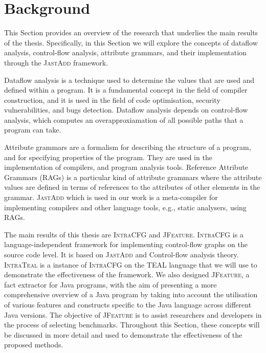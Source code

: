 \section{Background}
\label{sec:background}
This Section provides an overview of the research that 
underlies the main results of the thesis. Specifically, in this Section we will explore
the concepts of dataflow analysis, control-flow analysis, attribute grammars, 
and their implementation through the \textsc{JastAdd} framework.

Dataflow analysis is a technique used to determine the values that are used and 
defined within a program. It is a fundamental concept in the field of compiler 
construction, and it is used in the field of code optimisation, security vulnerabilities, and bugs detection. 
Dataflow analysis depends on control-flow analysis, which computes an overapproxiamation of
all possible paths that a program can take.

Attribute grammars are a formalism for describing the structure of a program, 
and for specifying properties of the program. They are used in the implementation 
of compilers, and program analysis tools.
Reference Attribute Grammars (RAGs) is a particular kind of attribute grammars 
where the attribute values are defined in terms of references to the attributes 
of other elements in the grammar. \textsc{JastAdd} which is used in our work is a meta-compiler 
for implementing compilers and other language tools, e.g., static analysers, using RAGs.

The main results of this thesis are \textsc{IntraCFG} and \textsc{JFeature}. 
\textsc{IntraCFG} is a language-independent framework for implementing control-flow graphs 
on the source code level.
It is based on \textsc{JastAdd} and Control-flow analysis theory. \textsc{IntraTeal} is a instance
of \textsc{IntraCFG} on the TEAL language that we will use to demonstrate the effectiveness
of the framework. We also designed \textsc{JFeature}, a fact extractor for Java programs,
with the aim of presenting a more comprehensive overview of a Java program by 
taking into account the utilisation of various features and constructs specific 
to the Java language across different Java versions. The objective of \textsc{JFeature} is
to assist researchers and developers in the process of selecting benchmarks.
Throughout this Section, these concepts will be discussed in more detail and used to 
demonstrate the effectiveness of the proposed methods.

